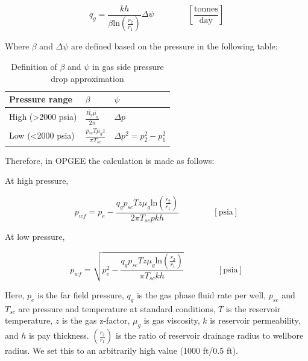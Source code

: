 \documentclass[11pt]{report}
\newcommand{\eqnunit}[1]{\quad\quad \scriptstyle{\left[\text{#1}\right]}}
\newcommand{\eqnunitfrac}[2]{\quad\quad \scriptstyle{\left[\frac{\text{#1}}{\text{#2}}\right]}}
\begin{document}
\begin{equation} 
q_{g} = \frac{k h}{\beta \text{ln}\left(\frac{r_2}{r_1} \right)} \Delta \psi \quad\quad\eqnunitfrac{tonnes}{day}
\end{equation}

Where $\beta$ and $\Delta \psi$ are defined based on the pressure in the following table:

\begin{table}[h]
\begin{scriptsize}
\caption{Definition of $\beta$ and $\psi$ in gas side pressure drop approximation}
\begin{tabular*}{0.8\columnwidth}{p{}p{}p{}}
\toprule
Pressure range & $\beta$ & $\psi$ \\
\midrule
High (>2000 psia) & $\frac{\overline{B_g}\overline{\mu_g}}{2\pi}$ & $\Delta p$ \\
Low (<2000 psia) & $\frac{p_{sc} T \overline{\mu_g} \overline{z}}{\pi T_{sc}}$ & $\Delta p^2 = p_2^2 - p_1^2$ \\
\bottomrule
\end{tabular*}
\end{scriptsize}
\end{table}

Therefore, in OPGEE the calculation is made as follows:

At high pressure,

\begin{equation} 
p_{wf} = p_e - \frac{q_g p_{sc} T z \mu_g \text{ln}\left(\frac{r_2}{r_1} \right)}{2 \pi T_{sc} p k h} \quad\quad\eqnunit{psia}
\end{equation}

At low pressure,

\begin{equation} 
p_{wf} = \sqrt{p_e^2 - \frac{q_g p_{sc} T z \mu_g \text{ln}\left(\frac{r_2}{r_1} \right)}{\pi T_{sc} k h}} \quad\quad\eqnunit{psia}
\end{equation}

Here, $p_e$ is the far field pressure, $q_g$ is the gas phase fluid rate per well, $p_{sc}$ and $T_{sc}$ are pressure and temperature at standard conditions, $T$ is the reservoir temperature, $z$ is the gas z-factor, $\mu_g$ is gas viscosity, $k$ is reservoir permeability, and $h$ is pay thickness. $\left(\frac{r_2}{r_1} \right)$ is the ratio of reservoir drainage radius to wellbore radius. We set this to an arbitrarily high value (1000 ft/0.5 ft).
\end{document}
